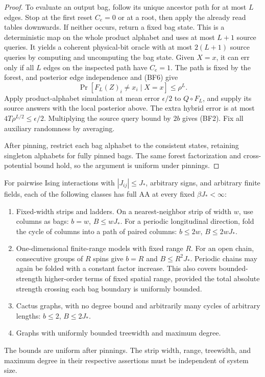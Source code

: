 \begin{proof}
To evaluate an output bag, follow its unique ancestor path for at
most $L$ edges. Stop at the first reset $C_e=0$ or at a root, then
apply the already read tables downwards. If neither occurs, return
a fixed bag state. This is a deterministic map on the whole product
alphabet and uses at most $L+1$ source queries. It yields a coherent
physical-bit oracle with at most $2(L+1)$ source queries by computing
and uncomputing the bag state. Given $X=x$, it can err only if all
$L$ edges on the inspected path have $C_e=1$. The path is fixed by
the forest, and posterior edge independence and (BF6) give
\[
 \Pr[F_L(Z)_i\ne x_i\mid X=x]\le\rho^L.
\]
Apply product-alphabet simulation at mean error $\epsilon/2$ to
$Q\circ F_L$, and supply its source answers with the local posterior
above. The extra hybrid error is at most
$4T\rho^{L/2}\le\epsilon/2$. Multiplying the source query bound
by $2b$ gives (BF2). Fix all auxiliary randomness by averaging.

After pinning, restrict each bag alphabet to the consistent states,
retaining singleton alphabets for fully pinned bags. The same
forest factorization and cross-potential bound hold, so the argument
is uniform under pinnings.
\end{proof}

\begin{corollary}
\label{cor:classification-easy-graphs}
For pairwise Ising interactions with $|J_{ij}|\le J_*$, arbitrary
signs, and arbitrary finite fields, each of the following classes
has full AA at every fixed $\beta J_*<\infty$:
\begin{enumerate}
\item Fixed-width strips and ladders. On a nearest-neighbor strip
of width $w$, use columns as bags: $b=w$, $B\le wJ_*$.
For a periodic longitudinal direction, fold the cycle of columns
into a path of paired columns: $b\le2w$, $B\le2wJ_*$.
\item One-dimensional finite-range models with fixed range $R$.
For an open chain, consecutive groups of $R$ spins give $b=R$ and
$B\le R^2J_*$. Periodic chains may again be folded with a constant
factor increase. This also covers bounded-strength higher-order
terms of fixed spatial range, provided the total absolute strength
crossing each bag boundary is uniformly bounded.
\item Cactus graphs, with no degree bound and arbitrarily many
cycles of arbitrary lengths: $b\le2$, $B\le2J_*$.
\item Graphs with uniformly bounded treewidth and maximum degree.
\end{enumerate}
The bounds are uniform after pinnings. The strip width, range,
treewidth, and maximum degree in their respective assertions must
be independent of system size.
\end{corollary}

